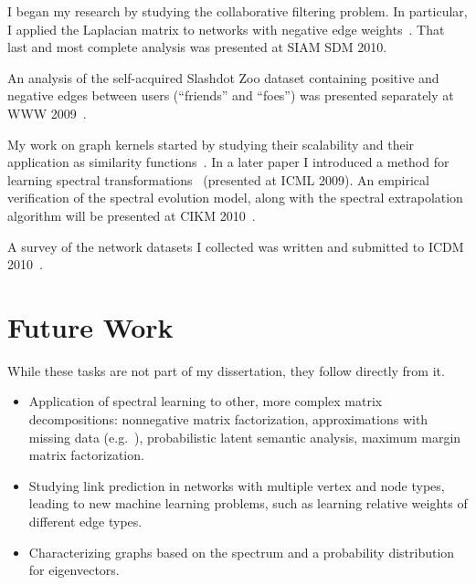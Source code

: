 \documentclass[10pt,twocolumn]{article}
\begin{document}
I began my research by studying the collaborative filtering problem.  In
particular, I applied the Laplacian matrix to networks with
negative edge
weights~\cite{kunegis:negative-resistance,kunegis:netflix-srd,kunegis:signed-kernels}.   
That last and most complete analysis was presented at SIAM SDM 2010. 

An analysis of the self-acquired Slashdot Zoo dataset containing
positive and negative edges between users (``friends'' and ``foes'') was
presented separately at WWW 2009~\cite{kunegis:slashdot-zoo}. 

My work on graph kernels started by studying their scalability and their
application as similarity
functions~\cite{kunegis:alternative-similarity,kunegis:kernel-scalability}.
In a later paper I introduced a method for learning spectral
transformations~\cite{kunegis:spectral-transformation} (presented at
ICML 2009).  
An empirical verification of the spectral evolution model, along with
the spectral extrapolation algorithm will be presented at CIKM
2010~\cite{kunegis:spectral-network-evolution}. 

A survey of the network datasets I collected was written and submitted
to ICDM 2010~\cite{kunegis:network-survey}. 

\section{Future Work}
While these tasks are not part of my dissertation, they follow directly
from it.
\begin{itemize}
\item Application of spectral learning to other, more complex matrix
  decompositions:  nonnegative matrix factorization, approximations with
  missing data (e.g.~\cite{b178}), probabilistic latent semantic
  analysis, maximum margin matrix factorization.
\item Studying link prediction in networks with multiple vertex and node
  types, leading to new machine learning problems, such as learning
  relative weights of different edge types. 
\item Characterizing graphs based on the spectrum and a probability
  distribution for eigenvectors. 
\end{itemize}



\end{document}
